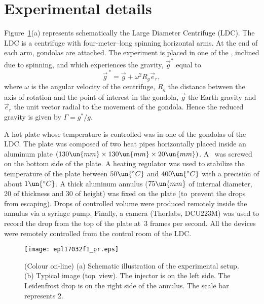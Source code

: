\documentclass[doublecol,final]{epl2}
\begin{document}
\section{Experimental details}

Figure~\ref{epl17032fig1}(a) represents schematically the Large Diameter Centrifuge (LDC). The LDC is a centrifuge with four-meter--long spinning horizontal arms. At the end of each arm, gondolas are attached. The experiment is placed in one of the , inclined due to spinning, and which experiences the  gravity, ${\vec{g}}^{*}$ equal to
\begin{equation}%
\vec{g}^{\ *} = \vec{g} + \omega^{2} R_{g} {\vec{e}}_r, \label{epl17032eqn1}
\end{equation}
where $\omega$ is the angular velocity of the centrifuge, $R_{g}$ the distance between the axis of rotation and the point of interest in the gondola, $\vec{g}$ the Earth gravity and $\vec{e}_r$ the unit vector radial to the movement of the gondola. Hence the reduced gravity is given by $\Gamma = g^*/g$.

A hot plate whose temperature is controlled was  in one of the gondolas of the LDC. The plate was composed of two heat pipes horizontally placed inside an aluminum plate $(130\un{mm} \times 130\un{mm} \times 20\un{mm})$. A~ was screwed on the bottom side of the plate. A heating regulator was used to stabilize the temperature of the plate between $50\un{^{\circ}C}$ and $400\un{^{\circ}C}$ with a precision of about $1\un{^{\circ}C}$. A thick aluminum annulus ($75\un{mm}$ of internal diameter, 20 of thickness and 30 of height) was fixed on the plate (to~prevent the drops from escaping). Drops of controlled volume were produced remotely inside the annulus via a syringe pump. Finally, a camera (Thorlabs, DCU223M) was used to record the drop from the top of the plate at~3 frames per second. All the devices were remotely controlled from the control room of the LDC.

\begin{figure}%
\centering
\texttt{[image: epl17032f1\_pr.eps]}
\caption{(Colour on-line) (a) Schematic illustration of the experimental setup. (b) Typical image (top~view). The injector is on the left side. The Leidenfrost drop is on the right side of the annulus. The scale bar represents 2.} \label{epl17032fig1}
\vspace*{-5pt}
\end{figure}
\end{document}
